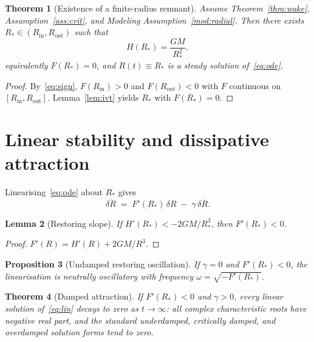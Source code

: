 \documentclass[11pt]{article}
\newtheorem{theorem}{Theorem}[section]
\newtheorem{lemma}[theorem]{Lemma}
\newtheorem{proposition}[theorem]{Proposition}
\theoremstyle{definition}
\theoremstyle{remark}
\newcommand{\GM}{GM}
\begin{document}
\begin{theorem}[Existence of a finite-radius remnant]
\label{thm:existence}
Assume Theorem~\ref{thm:wake}, Assumption~\ref{ass:crit}, and Modeling
Assumption~\ref{mod:radial}.
Then there exists $R_\ast\in(R_{\mathrm{in}},R_{\mathrm{out}})$ such that
\begin{equation}
\label{eq:balance}
H(R_\ast)=\frac{\GM}{R_\ast^{2}},
\end{equation}
equivalently $F(R_\ast)=0$, and $R(t)\equiv R_\ast$ is a steady solution of~\eqref{eq:ode}.
\end{theorem}

\begin{proof}
By~\eqref{eq:sign}, $F(R_{\mathrm{in}})>0$ and $F(R_{\mathrm{out}})<0$ with $F$ continuous
on $[R_{\mathrm{in}},R_{\mathrm{out}}]$.
Lemma~\ref{lem:ivt} yields $R_\ast$ with $F(R_\ast)=0$.
\end{proof}

\section{Linear stability and dissipative attraction}
\label{sec:stability}
Linearising~\eqref{eq:ode} about $R_\ast$ gives
\begin{equation}
\label{eq:lin}
\delta\ddot R \;=\; F'(R_\ast)\,\delta R\;-\;\gamma\,\delta\dot R.
\end{equation}

\begin{lemma}[Restoring slope]
\label{lem:slope}
If $H'(R_\ast)<-2\GM/R_\ast^{3}$, then $F'(R_\ast)<0$.
\end{lemma}

\begin{proof}
$F'(R)=H'(R)+2\GM/R^{3}$.
\end{proof}

\begin{proposition}[Undamped restoring oscillation]
\label{prop:undamped}
If $\gamma=0$ and $F'(R_\ast)<0$, the linearisation is neutrally oscillatory with
frequency $\omega=\sqrt{-F'(R_\ast)}$.
\end{proposition}

\begin{theorem}[Damped attraction]
\label{thm:damped}
If $F'(R_\ast)<0$ and $\gamma>0$, every linear solution of~\eqref{eq:lin} decays to
zero as $t\to\infty$: all complex characteristic roots have negative real part, and the
standard underdamped, critically damped, and overdamped solution forms tend to zero.
\end{theorem}
\end{document}
